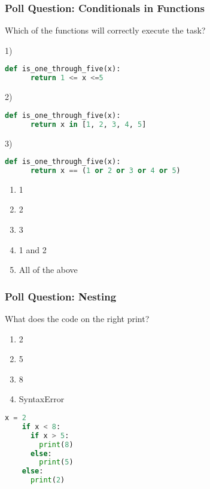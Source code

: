 \documentclass{beamer}
\begin{document}
%
%
\begin{frame}[fragile]
	\frametitle{Poll Question: Conditionals in Functions}
  Which of the functions will correctly execute the task?
	\begin{minipage}{0.7\textwidth}
    1)
		\begin{lstlisting}[language=Python, autogobble,basicstyle=\tiny,numbers=none]
    def is_one_through_five(x):
      return 1 <= x <=5
		\end{lstlisting}
    2)
		\begin{lstlisting}[language=Python, autogobble,basicstyle=\tiny,numbers=none]
    def is_one_through_five(x):
      return x in [1, 2, 3, 4, 5]
		\end{lstlisting}
    3)
		\begin{lstlisting}[language=Python, autogobble,basicstyle=\tiny,numbers=none]
    def is_one_through_five(x):
      return x == (1 or 2 or 3 or 4 or 5)
		\end{lstlisting}
	\end{minipage}
  \begin{minipage}{0.29\textwidth}
    \begin{enumerate}[A]
      \item 1
      \item 2
      \item 3
      \item 1 and 2
      \item All of the above
    \end{enumerate}
	\end{minipage}
\end{frame}




%
%
\begin{frame}[fragile]
  \frametitle{Poll Question: Nesting}
  What does the code on the right print?
  \vfill
  \begin{minipage}{0.49\textwidth}
    \begin{enumerate}[A]
      \item 2
      \item 5
      \item 8
      \item SyntaxError
    \end{enumerate}
  \end{minipage}
  \begin{minipage}{0.49\textwidth}
    \begin{lstlisting}[language=Python, autogobble]
    x = 2
    if x < 8:
      if x > 5:
        print(8)
      else:
        print(5)
    else:
      print(2)
    \end{lstlisting}
  \end{minipage}
\end{frame}
\end{document}
